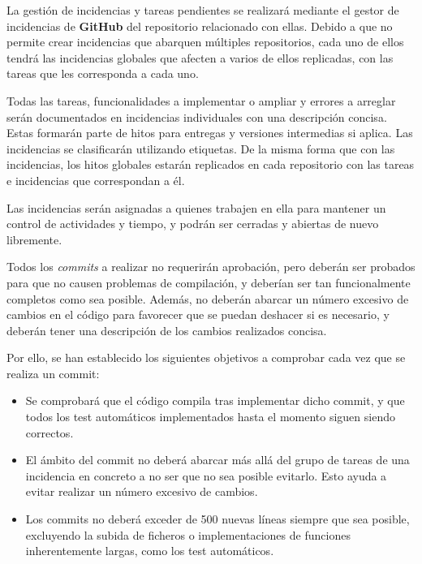 \documentclass[11pt, a4paper, titlepage]{article}
\begin{document}
\item La gestión de incidencias y tareas pendientes se realizará mediante el gestor de incidencias de \textbf{GitHub} del repositorio relacionado con ellas. Debido a que no permite crear incidencias que abarquen múltiples repositorios, cada uno de ellos tendrá las incidencias globales que afecten a varios de ellos replicadas, con las tareas que les corresponda a cada uno.

    \item Todas las tareas, funcionalidades a implementar o ampliar y errores a arreglar serán documentados en incidencias individuales con una descripción concisa. Estas formarán parte de hitos para entregas y versiones intermedias si aplica. Las incidencias se clasificarán utilizando etiquetas. De la misma forma que con las incidencias, los hitos globales estarán replicados en cada repositorio con las tareas e incidencias que correspondan a él.

    Las incidencias serán asignadas a quienes trabajen en ella para mantener un control de actividades y tiempo, y podrán ser cerradas y abiertas de nuevo libremente.

    \item Todos los \textit{commits} a realizar no requerirán aprobación, pero deberán ser probados para que no causen problemas de compilación, y deberían ser tan funcionalmente completos como sea posible. Además, no deberán abarcar un número excesivo de cambios en el código para favorecer que se puedan deshacer si es necesario, y deberán tener una descripción de los cambios realizados concisa.

    Por ello, se han establecido los siguientes objetivos a comprobar cada vez que se realiza un commit:
    \begin{itemize}
        \item Se comprobará que el código compila tras implementar dicho commit, y que todos los test automáticos implementados hasta el momento siguen siendo correctos.
        \item El ámbito del commit no deberá abarcar más allá del grupo de tareas de una incidencia en concreto a no ser que no sea posible evitarlo. Esto ayuda a evitar realizar un número excesivo de cambios.
        \item Los commits no deberá exceder de 500 nuevas líneas siempre que sea posible, excluyendo la subida de ficheros o implementaciones de funciones inherentemente largas, como los test automáticos.
    \end{itemize}
\end{document}
